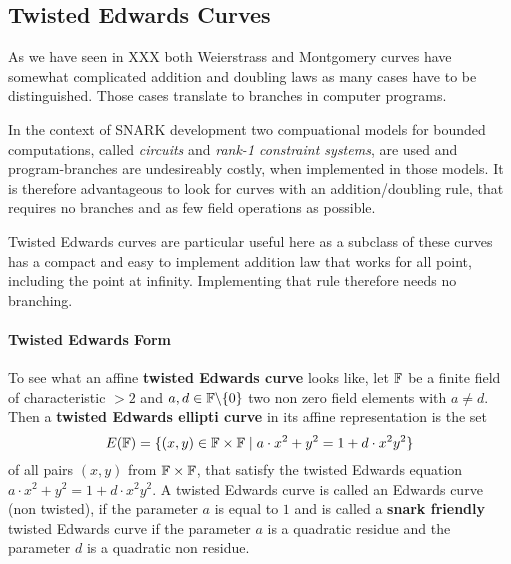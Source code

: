 
\subsection{Twisted Edwards Curves}
As we have seen in XXX both Weierstrass and Montgomery curves have somewhat complicated addition and doubling laws as many cases have to be distinguished. Those cases translate to branches in computer programs.

In the context of SNARK development two compuational models for bounded computations, called \textit{circuits} and \textit{rank-1 constraint systems}, are used and program-branches are undesireably costly, when implemented in those models. It is therefore advantageous to look for curves with an addition/doubling rule, that requires no branches and as few field operations as possible.

Twisted Edwards curves are particular useful here as a subclass of these curves has a compact and easy to implement addition law that works for all point, including the point at infinity. Implementing that rule therefore needs no branching. 
\paragraph{Twisted Edwards Form}
To see what an affine \textbf{twisted Edwards curve} looks like, let $\mathbb{F}$ be a finite field of characteristic $>2$ and $a,d\in \mathbb{F}\backslash\{0\}$ two non zero field elements with $a\neq d$. Then a \textbf{twisted Edwards ellipti curve} in its affine representation is the set
\begin{equation}
E(\mathbb{F})=\{(x,y)\in\mathbb{F}\times\mathbb{F}\;|\; a\cdot x^2+y^2= 1+d\cdot x^2y^2\}
\end{equation} 
of all pairs $(x,y)$ from $\mathbb{F}\times \mathbb{F}$, that satisfy the twisted Edwards equation $a\cdot x^2+y^2= 1+d\cdot x^2y^2$. A twisted Edwards curve is called an Edwards curve (non twisted), if the parameter $a$ is equal to $1$ and is called a \textbf{snark friendly} twisted Edwards curve if the parameter $a$ is a quadratic residue and the parameter $d$ is a quadratic non residue.

